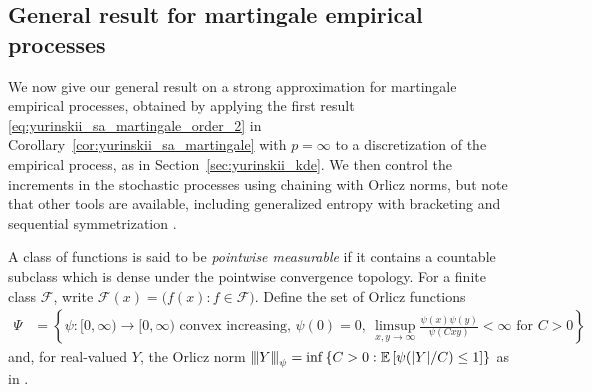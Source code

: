 \documentclass[11pt,lof]{puthesis}
\newcommand{\E}{\ensuremath{\mathbb{E}}}
\newcommand{\cF}{\ensuremath{\mathcal{F}}}
\newcommand{\vvvert}{{\vert\kern-0.25ex\vert\kern-0.25ex\vert}}
\theoremstyle{break}
\theoremstyle{proof}
\begin{document}
\subsection{General result for martingale empirical processes}

We now give our general result on a strong approximation for
martingale empirical processes, obtained by applying
the first result \eqref{eq:yurinskii_sa_martingale_order_2} in
Corollary~\ref{cor:yurinskii_sa_martingale} with $p=\infty$
to a discretization of the empirical process,
as in Section~\ref{sec:yurinskii_kde}.
We then control the increments in the stochastic processes
using chaining with Orlicz norms,
but note that other tools are available,
including generalized entropy with bracketing \citep{geer2000empirical}
and sequential symmetrization \citep{rakhlin2015sequential}.

A class of functions is said to be \emph{pointwise measurable}
if it contains a countable subclass which is dense under
the pointwise convergence topology.
For a finite class $\cF$, write
$\cF(x) = \big(f(x) : f \in \cF\big)$.
Define the set of Orlicz functions
%
\begin{align*}
  \Psi
  &=
  \left\{
    \psi: [0, \infty) \to [0, \infty)
    \text{ convex increasing, }
    \psi(0) = 0,\
    \limsup_{x,y \to \infty} \tfrac{\psi(x) \psi(y)}{\psi(C x y)} < \infty
    \text{ for } C > 0
  \right\}
\end{align*}
%
and, for real-valued $Y$, the Orlicz norm
$\vvvert Y \vvvert_\psi
= \inf
\left\{ C > 0:
  \E \left[ \psi(|Y|/C) \leq 1 \right]
\right\}$
as in \citet[Section~2.2]{van1996weak}.
\end{document}
